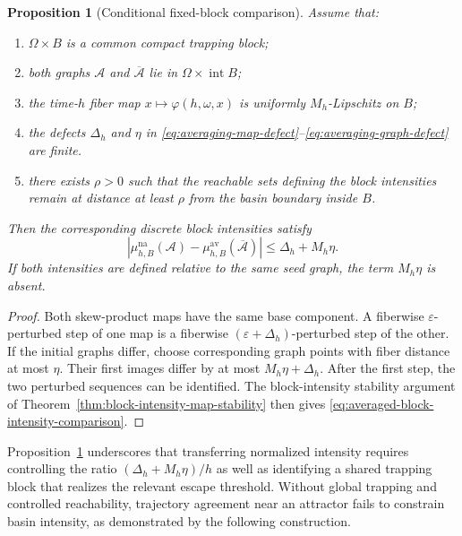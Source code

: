 \documentclass[pdflatex,sn-mathphys-num]{sn-jnl}
\numberwithin{equation}{section}
\theoremstyle{thmstyleone}%
\newtheorem{proposition}[theorem]{Proposition}
\theoremstyle{definition}
\theoremstyle{remark}
\begin{document}
\begin{proposition}[Conditional fixed-block comparison]
\label{prop:averaged-block-comparison}
Assume that:
\begin{enumerate}
    \item $\Omega \times B$ is a common compact trapping block;
    \item both graphs $\mathcal A$ and $\overline{\mathcal A}$ lie in $\Omega \times \operatorname{int} B$;
    \item the time-$h$ fiber map $x \mapsto \varphi(h, \omega, x)$ is uniformly $M_h$-Lipschitz on $B$;
    \item the defects $\Delta_h$ and $\eta$ in \eqref{eq:averaging-map-defect}--\eqref{eq:averaging-graph-defect} are finite.
    \item there exists $\rho>0$ such that the reachable sets defining the block intensities remain at distance at least $\rho$ from the basin boundary inside $B$.
\end{enumerate}
Then the corresponding discrete block intensities satisfy
\begin{equation}
\label{eq:averaged-block-intensity-comparison}
    \left| \mu_{h,B}^{\mathrm{na}}(\mathcal A) - \mu_{h,B}^{\mathrm{av}}(\overline{\mathcal A}) \right| \leq \Delta_h + M_h\eta.
\end{equation}
If both intensities are defined relative to the same seed graph, the term $M_h\eta$ is absent.
\end{proposition}

\begin{proof}
Both skew-product maps have the same base component. A fiberwise $\varepsilon$-perturbed step of one map is a fiberwise $(\varepsilon+\Delta_h)$-perturbed step of the other. If the initial graphs differ, choose corresponding graph points with fiber distance at most $\eta$. Their first images differ by at most $M_h\eta+\Delta_h$. After the first step, the two perturbed sequences can be identified. The block-intensity stability argument of Theorem~\ref{thm:block-intensity-map-stability} then gives \eqref{eq:averaged-block-intensity-comparison}.
\end{proof}

Proposition~\ref{prop:averaged-block-comparison} underscores that transferring normalized intensity requires controlling the ratio $(\Delta_h + M_h\eta)/h$ as well as identifying a shared trapping block that realizes the relevant escape threshold. Without global trapping and controlled reachability, trajectory agreement near an attractor fails to constrain basin intensity, as demonstrated by the following construction.
\end{document}
